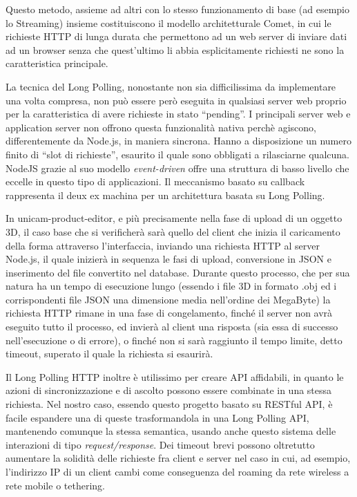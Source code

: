 Questo metodo, assieme ad altri con lo stesso funzionamento di base 
(ad esempio lo Streaming) insieme costituiscono il modello architetturale 
Comet, in cui le richieste HTTP di lunga durata che permettono ad un web 
server di inviare dati ad un browser senza che quest'ultimo li abbia 
esplicitamente richiesti ne sono la caratteristica principale.

La tecnica del Long Polling, nonostante non sia difficilissima da 
implementare una volta compresa, non può essere però eseguita in 
qualsiasi server web proprio per la caratteristica di avere richieste 
in stato “pending”. I principali server web e application server non 
offrono questa funzionalità nativa perchè agiscono, differentemente da 
Node.js, in maniera sincrona. Hanno a disposizione un numero finito di 
“slot di richieste”, esaurito il quale sono obbligati a rilasciarne qualcuna.
NodeJS grazie al suo modello \emph{event-driven} offre una struttura di 
basso livello che eccelle in questo tipo di applicazioni. Il meccanismo 
basato su callback rappresenta il deux ex machina per un architettura 
basata su Long Polling.

In unicam-product-editor, e più precisamente nella fase di upload di 
un oggetto 3D, il caso base che si verificherà sarà quello del client 
che inizia il caricamento della forma attraverso l'interfaccia, 
inviando una richiesta HTTP al server Node.js, il quale inizierà in 
sequenza le fasi di upload, conversione in JSON e inserimento del file 
convertito nel database. Durante questo processo, che per sua natura 
ha un tempo di esecuzione lungo (essendo i file 3D in formato .obj ed 
i corrispondenti file JSON una dimensione media nell'ordine dei MegaByte) 
la richiesta HTTP rimane in una fase di congelamento, finché il server 
non avrà eseguito tutto il processo, ed invierà al client una risposta 
(sia essa di successo nell'esecuzione o di errore), o finché non si 
sarà raggiunto il tempo limite, detto timeout, superato il quale la 
richiesta si esaurirà.

Il Long Polling HTTP inoltre è utilissimo per creare API affidabili, 
in quanto le azioni di sincronizzazione e di ascolto possono essere 
combinate in una stessa richiesta. Nel nostro caso, essendo questo 
progetto basato su RESTful API, è facile espandere una di queste 
trasformandola in una Long Polling API, mantenendo comunque la stessa 
semantica, usando anche questo sistema delle interazioni di tipo 
\emph{request/response}. Dei timeout brevi possono oltretutto aumentare 
la solidità delle richieste fra client e server nel caso in cui, ad 
esempio, l'indirizzo IP di un client cambi come conseguenza del roaming 
da rete wireless a rete mobile o tethering.

